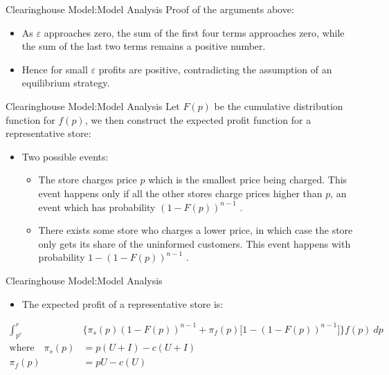 \documentclass[aspectratio=169]{beamer}  %
\begin{document}
\begin{frame}{Clearinghouse Model:Model Analysis}
    Proof of the arguments above:
    \begin{itemize}
        \item As $\varepsilon$ approaches zero, the sum of the first four terms approaches zero, while the sum of the last two terms remains a positive number.
        \item Hence for small $\varepsilon$ profits are positive, contradicting the assumption of an equilibrium strategy.
    \end{itemize}
\end{frame}

\begin{frame}{Clearinghouse Model:Model Analysis}
    Let $F(p)$ be the cumulative distribution function for $f(p)$, we then construct the expected profit function for a representative store:
    \begin{itemize}
        \item Two possible events:
        \begin{itemize}
            \item The store charges price $p$ which is the smallest price being charged. This event happens only if all the other stores charge prices higher than $p$, an event which has probability $(1 - F(p))^{n-1}$ .
            \item There exists some store who charges a lower price, in which case the store only gets its share of the uninformed customers. This event happens with probability $1-(1 - F(p))^{n-1}$ .
        \end{itemize}
    \end{itemize}
\end{frame}

\begin{frame}{Clearinghouse Model:Model Analysis}
    \begin{itemize}
        \item The expected profit of a representative store is:
        \end{itemize}
        \begin{align*}
            \int_{p^*}^{r} &\{\pi_s(p)  (1 - F(p))^{n-1}+ \pi_f(p)  \bigg[1 -(1 - F(p))^{n-1} \bigg]\}f(p)\ dp \\
               \text{where} \quad 
               \pi_s(p) &= p(U + I) - c(U + I) \\
               \pi_f(p) &= pU - c(U) 
           \end{align*}
\end{frame}
\end{document}
